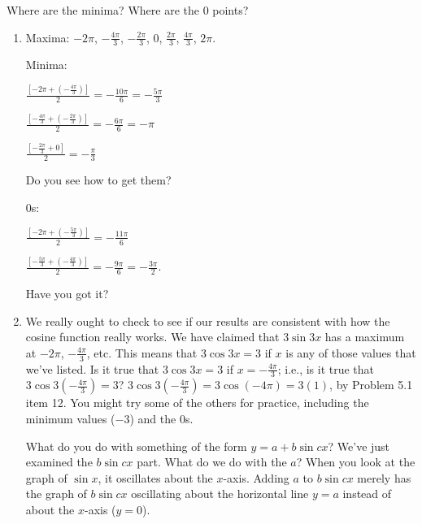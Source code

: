 \documentclass[english]{book}
\begin{document}
Where are the minima? Where are the $0$ points?

\begin{enumerate}
  \item[\hspace{1cm}6)] Maxima: $-2\pi$, $-\frac{4\pi}{3}$, $-\frac{2\pi}{3}$, $0$, $\frac{2\pi}{3}$, $\frac{4\pi}{3}$, $2\pi$. 

      Minima:

      $\frac{[-2\pi+(-\frac{4\pi}{3})]}{2} = -\frac{10\pi}{6} = -\frac{5\pi}{3}$

      $\frac{[-\frac{4\pi}{3}+(-\frac{2\pi}{3})]}{2} = -\frac{6\pi}{6} = -\pi$

      $\frac{[-\frac{2\pi}{3}+0]}{2} = -\frac{\pi}{3}$

      Do you see how to get them? 

      $0$s:

      $\frac{[-2\pi+(-\frac{5\pi}{3})]}{2} = -\frac{11\pi}{6}$

      $\frac{[-\frac{5\pi}{3}+(-\frac{4\pi}{3})]}{2} = -\frac{9\pi}{6} = -\frac{3\pi}{2}$.

      Have you got it?
  \item[\hspace{1cm}7)] We really ought to check to see if our results are consistent with how the cosine function really works. We have claimed that $3 \sin 3x$ has a maximum at $-2\pi$, $-\frac{4\pi}{3}$, etc. This means that $3 \cos 3x = 3$ if $x$ is any of those values that we've listed. Is it true that $3 \cos 3x = 3$ if $x = -\frac{4\pi}{3}$; i.e., is it true that $3 \cos 3(-\frac{4\pi}{3}) = 3$? $3 \cos 3(-\frac{4\pi}{3}) = 3 \cos (-4\pi) = 3(1)$, by Problem 5.1 item 12. You might try some of the others for practice, including the minimum values ($-3$) and the $0$s.

       What do you do with something of the form $y = a+b \sin cx$? We've just examined the $b \sin cx$ part. What do we do with the $a$? When you look at the graph of $\sin x$, it oscillates about the $x$-axis. Adding $a$ to $b \sin cx$ merely has the graph of $b \sin cx$ oscillating about the horizontal line $y=a$ instead of about the $x$-axis ($y=0$).
\end{enumerate}
\end{document}
